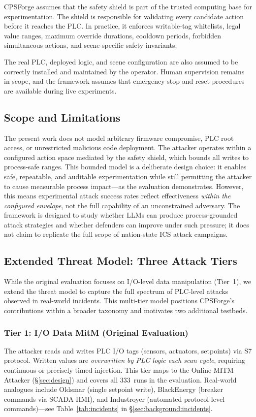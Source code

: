 CPSForge assumes that the safety shield is part of the trusted computing base for experimentation. The shield is responsible for validating every candidate action before it reaches the PLC. In practice, it enforces writable-tag whitelists, legal value ranges, maximum override durations, cooldown periods, forbidden simultaneous actions, and scene-specific safety invariants.

The real PLC, deployed logic, and scene configuration are also assumed to be correctly installed and maintained by the operator. Human supervision remains in scope, and the framework assumes that emergency-stop and reset procedures are available during live experiments.

\subsection{Scope and Limitations}

The present work does not model arbitrary firmware compromise, PLC root access, or unrestricted malicious code deployment. The attacker operates within a configured action space mediated by the safety shield, which bounds all writes to process-safe ranges. This bounded model is a deliberate design choice: it enables safe, repeatable, and auditable experimentation while still permitting the attacker to cause measurable process impact---as the evaluation demonstrates. However, this means experimental attack success rates reflect effectiveness \emph{within the configured envelope}, not the full capability of an unconstrained adversary. The framework is designed to study whether LLMs can produce process-grounded attack strategies and whether defenders can improve under such pressure; it does not claim to replicate the full scope of nation-state ICS attack campaigns.

\subsection{Extended Threat Model: Three Attack Tiers}
\label{sec:threat:tiers}

While the original evaluation focuses on I/O-level data manipulation (Tier~1), we extend the threat model to capture the full spectrum of PLC-level attacks observed in real-world incidents. This multi-tier model positions CPSForge's contributions within a broader taxonomy and motivates two additional testbeds.

\subsubsection{Tier 1: I/O Data MitM (Original Evaluation)}
The attacker reads and writes PLC I/O tags (sensors, actuators, setpoints) via S7 protocol. Written values are \emph{overwritten by PLC logic each scan cycle}, requiring continuous or precisely timed injection. This tier maps to the Online MITM Attacker (\S\ref{sec:design}) and covers all 333~runs in the evaluation. Real-world analogues include Oldsmar (single setpoint write), BlackEnergy (breaker commands via SCADA HMI), and Industroyer (automated protocol-level commands)---see Table~\ref{tab:incidents} in \S\ref{sec:background:incidents}.

